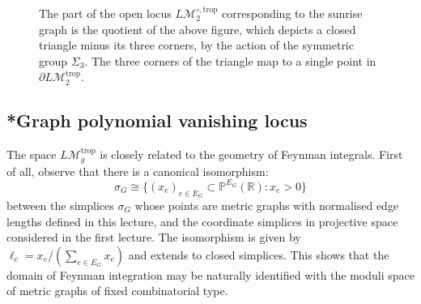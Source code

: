 \documentclass[12pt]{amsart}
\newcommand{\PP}{{\mathbb P}}
\newcommand{\RR}{{\mathbb R}}
\theoremstyle{plain}
\newcommand{\LM}{L\mathcal{M}}
\newcommand{\trop}{\mathrm{trop}}
\newcommand{\0}{\color{blue}{\mathsf{0}}}
\begin{document}
\begin{figure}[h]
\caption{The part of the  open locus $\LM_2^{\circ,\trop}$ corresponding to the sunrise graph is the quotient of the above figure, which depicts a closed triangle minus its three corners, by the action of the symmetric group $\Sigma_3$. The three corners of the triangle map to a single point in $\partial \LM_2^{\trop}$.  } \label{fig: OPENsunrisesimplex}
\end{figure}







\subsection{*Graph polynomial vanishing locus} The space $\LM_g^{\trop}$ is closely related to the geometry of Feynman integrals.
First of all, observe that there is a canonical isomorphism:
\[  \sigma_G \cong \{ (x_e)_{e \in E_G} \subset \PP^{E_G}(\RR): x_e >0 \}\]
 between the  simplices $\sigma_G$ whose points are metric graphs with normalised edge lengths defined in this lecture, and the coordinate simplices in projective space
considered in the first lecture. The isomorphism is given by $\ell_e = x_e/(\sum_{e\in E_G} x_e)$ and  extends to closed simplices.  This  shows that the domain of Feynman integration may be naturally identified with the moduli space of metric graphs of fixed combinatorial type.
\end{document}
